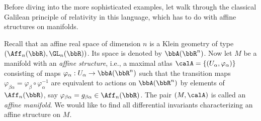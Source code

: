 Before diving into the more sophisticated examples, let walk through the classical Galilean principle of relativity in this language, which has to do with affine structures on manifolds.

\begin{example}
    Recall that an affine real space of dimension $n$ is a Klein geometry of type $(\Aff_n(\bbR),\GL_n(\bbR))$. Its space is denoted by $\bbA(\bbR^n)$. Now let $M$ be a manifold with an \emph{affine structure}, i.e., a maximal atlas $\calA=\{(U_\alpha,\varphi_\alpha)\}$ consisting of maps $\varphi_\alpha:U_\alpha\to \bbA(\bbR^n)$ such that the transition maps $\varphi_{\beta\alpha}=\varphi_\beta\circ\varphi_\alpha^{-1}$ are equivalent to actions on $\bbA(\bbR^n)$ by elements of $\Aff_n(\bbR)$, say $\varphi_{\beta\alpha}=g_{\beta\alpha}\in\Aff_n(\bbR)$. The pair $(M,\calA)$ is called an \emph{affine manifold}. We would like to find all differential invariants characterizing an affine structure on $M$.


\end{example}
